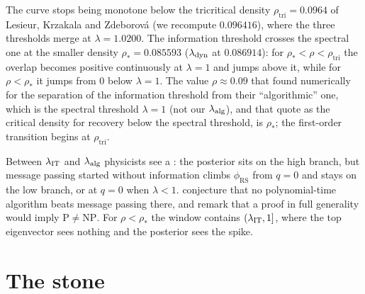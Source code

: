 \begin{refsection}
The curve stops being monotone below the tricritical density $\rho_{\mathrm{tri}}=0.0964$ of Lesieur, Krzakala and Zdeborová (we recompute $0.096416$), where the three thresholds merge at $\lambda=1.0200$. The information threshold crosses the spectral one at the smaller density $\rho_*=0.085593$ ($\lambda_{\mathrm{dyn}}$ at $0.086914$): for $\rho_*<\rho<\rho_{\mathrm{tri}}$ the overlap becomes positive continuously at $\lambda=1$ and jumps above it, while for $\rho<\rho_*$ it jumps from $0$ below $\lambda=1$. The value $\rho\approx0.09$ that \textcite{KrzakalaXuZdeborova2016} found numerically for the separation of the information threshold from their \enquote{algorithmic} one, which is the spectral threshold $\lambda=1$ (not our $\lambda_{\mathrm{alg}}$), and that \textcite{PerryWeinBandeiraMoitra2018} quote as the critical density for recovery below the spectral threshold, is $\rho_*$; the first-order transition begins at $\rho_{\mathrm{tri}}$.

Between $\lambda_{\mathrm{IT}}$ and $\lambda_{\mathrm{alg}}$ physicists see a : the posterior sits on the high branch, but message passing started without information climbs $\phi_{\mathrm{RS}}$ from $q=0$ and stays on the low branch, or at $q=0$ when $\lambda<1$. \Textcite{LesieurKrzakalaZdeborova2017} conjecture that no polynomial-time algorithm beats message passing there, and remark that a proof in full generality would imply $\mathrm P\ne\mathrm{NP}$. For $\rho<\rho_*$ the window contains $(\lambda_{\mathrm{IT}},1]$, where the top eigenvector sees nothing and the posterior sees the spike.

\section{The stone}\label{sec:spiked:stone}


\end{refsection}
